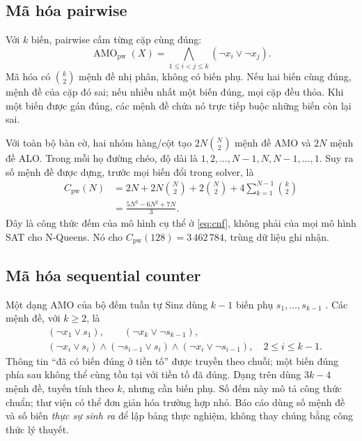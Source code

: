 \documentclass[a4paper,fleqn]{cas-sc}
\newcommand{\AMO}{\operatorname{AMO}}
\begin{document}
\subsection{Mã hóa pairwise}
Với $k$ biến, pairwise cấm từng cặp cùng đúng:
\begin{equation}\label{eq:pair}
 \AMO_{\mathrm{pw}}(X)=\bigwedge_{1\leq i<j\leq k}(\neg x_i\lor\neg x_j).
\end{equation}
Mã hóa có $\binom{k}{2}$ mệnh đề nhị phân, không có biến phụ. Nếu hai biến cùng đúng, mệnh đề của cặp đó sai; nếu nhiều nhất một biến đúng, mọi cặp đều thỏa. Khi một biến được gán đúng, các mệnh đề chứa nó trực tiếp buộc những biến còn lại sai.

Với toàn bộ bàn cờ, hai nhóm hàng/cột tạo $2N\binom{N}{2}$ mệnh đề AMO và $2N$ mệnh đề ALO. Trong mỗi họ đường chéo, độ dài là $1,2,\ldots,N-1,N,N-1,\ldots,1$. Suy ra số mệnh đề được dựng, trước mọi biến đổi trong solver, là
\begin{align}\label{eq:paircount}
 C_{\mathrm{pw}}(N)
 &=2N+2N\binom{N}{2}+2\binom{N}{2}+4\sum_{k=1}^{N-1}\binom{k}{2}\nonumber\\
 &=\frac{5N^3-6N^2+7N}{3}.
\end{align}
Đây là công thức đếm của mô hình cụ thể ở \eqref{eq:cnf}, không phải của mọi mô hình SAT cho N-Queens. Nó cho $C_{\mathrm{pw}}(128)=3\,462\,784$, trùng dữ liệu ghi nhận.

\subsection{Mã hóa sequential counter}
Một dạng AMO của bộ đếm tuần tự Sinz dùng $k-1$ biến phụ $s_1,\ldots,s_{k-1}$ \citep{sinz2005}. Các mệnh đề, với $k\geq2$, là
\begin{align}
 &(\neg x_1\lor s_1),\qquad(\neg x_k\lor\neg s_{k-1}),\label{eq:seq}\\
 &(\neg x_i\lor s_i)\land(\neg s_{i-1}\lor s_i)\land(\neg x_i\lor\neg s_{i-1}),
 \quad 2\leq i\leq k-1.\nonumber
\end{align}
Thông tin ``đã có biến đúng ở tiền tố'' được truyền theo chuỗi; một biến đúng phía sau không thể cùng tồn tại với tiền tố đã đúng. Dạng trên dùng $3k-4$ mệnh đề, tuyến tính theo $k$, nhưng cần biến phụ. Số đếm này mô tả công thức chuẩn; thư viện có thể đơn giản hóa trường hợp nhỏ. Báo cáo dùng số mệnh đề và số biến \emph{thực sự sinh ra} để lập bảng thực nghiệm, không thay chúng bằng công thức lý thuyết.
\end{document}
